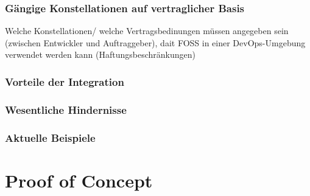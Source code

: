 \documentclass[12pt,titlepage]{article}
\begin{document}
\subsubsection{Gängige Konstellationen auf vertraglicher Basis}
Welche Konstellationen/ welche Vertragsbedinungen müssen angegeben sein (zwischen Entwickler und Auftraggeber), dait FOSS in einer DevOps-Umgebung verwendet werden kann (Haftungsbeschränkungen)
\subsubsection{Vorteile der Integration}
\subsubsection{Wesentliche Hindernisse}
\subsubsection{Aktuelle Beispiele}

\section{Proof of Concept}


\end{document}
